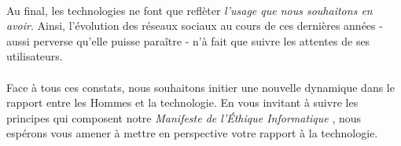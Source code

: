 \paragraph{} Au final, les technologies ne font que reflèter \emph{l'usage que nous souhaitons en avoir}. 
Ainsi, l'évolution des réseaux sociaux au cours de ces dernières années - aussi perverse qu'elle puisse paraître -
n'à fait que suivre les attentes de ses utilisateurs.

\paragraph{} Face à tous ces constats, nous souhaitons initier une nouvelle dynamique dans le rapport entre les
Hommes et la technologie. En vous invitant à suivre les principes qui composent notre \emph{Manifeste de l'Éthique
Informatique} \cite{FriesMilano0}, nous espérons vous amener à mettre en perspective votre rapport à la technologie.
